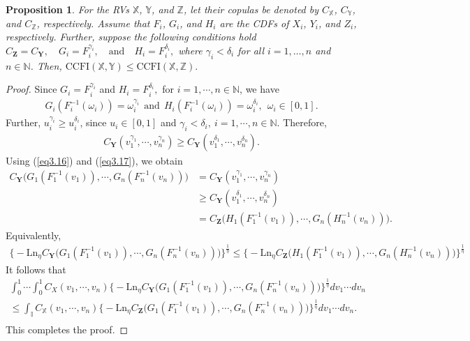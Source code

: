\documentclass[12pt, a4paper]{article}
\numberwithin{equation}{section}
\newtheorem{proposition}{Proposition}[section]
\begin{document}
\begin{proposition}\label{prop3.3}
For the RVs \(\mathbb{X}\), \(\mathbb{Y}\), and \(\mathbb{Z}\), let their copulas be denoted by \(C_{\mathbb{X}}\), \(C_{\mathbb{Y}}\), and \(C_{\mathbb{Z}}\), respectively. Assume that \(F_i\), \(G_i\), and \(H_i\) are the CDFs of \(X_i\), \(Y_i\), and \(Z_i\), respectively. Further, suppose the following conditions hold $
C_{\mathbf{Z}} = C_{\mathbf{Y}}, \quad G_i = F_i^{\gamma_i}, \quad \text{and} \quad H_i = F_i^{\delta_i},$
where \(\gamma_i < \delta_i\) for all \(i = 1, \dots, n\) and \(n \in \mathbb{N}\).  
Then, $
\text{CCFI}(\mathbb{X}, \mathbb{Y}) \le \text{CCFI}(\mathbb{X}, \mathbb{Z}).$
\end{proposition}
\begin{proof}
Since $G_i=F_i^{\gamma_i}$ and $H_i=F_i^{\delta_i},$ for $i=1,\cdots,n\in\mathbb{N}$, we have
\begin{align}\label{eq3.16}
G_i(F_i^{-1}(\omega_i))=\omega_i^{\gamma_i}~~\text{and}~~H_i(F_i^{-1}(\omega_i))=\omega_i^{\delta_i},~~\omega_i\in[0,1].
\end{align}
Further, $u_i^{\gamma_i}\ge u_i^{\delta_i}$, since  $u_i\in[0,1]$ and $\gamma_i<\delta_i,~i=1,\cdots,n\in\mathbb{N}.$ Therefore,
\begin{align}\label{eq3.17}
C_\textbf{Y}(v_1^{\gamma_1},\cdots,v_n^{\gamma_n})\ge C_\textbf{Y}(v_1^{\delta_1},\cdots,v_n^{\delta_n}).
\end{align}
Using (\ref{eq3.16}) and (\ref{eq3.17}), we obtain
\begin{align*}
C_\textbf{Y}\Big(G_1(F_1^{-1}(v_1)),\cdots,G_n(F_n^{-1}(v_n))\Big)&=C_\textbf{Y}(v_1^{\gamma_1},\cdots,v_n^{\gamma_n})\nonumber\\
&\ge C_\textbf{Y}(v_1^{\delta_1},\cdots,v_n^{\delta_n})\nonumber\\
&=C_\textbf{Z}\Big(H_1(F_1^{-1}(v_1)),\cdots,G_n(H_n^{-1}(v_n))\Big).
\end{align*}
Equivalently,
\begin{align*}
\Big\{-\mathrm{Ln}_{\eta} C_\textbf{Y}\Big(G_1(F_1^{-1}(v_1)),\cdots,G_n(F_n^{-1}(v_n))\Big)\Big\}^{\frac{1}{\eta}}\le \Big\{-\mathrm{Ln}_\eta C_\textbf{Z}\Big(H_1(F_1^{-1}(v_1)),\cdots,G_n(H_n^{-1}(v_n))\Big)\Big\}^{\frac{1}{\eta}}
\end{align*}
It follows that
\begin{align*}
\int_{0}^{1}\cdots \int_{0}^{1} C_X(v_1,\cdots,v_n)\Big\{-\mathrm{Ln}_\eta C_\textbf{Y}\Big(G_1(F_1^{-1}(v_1)),\cdots,G_n(F_n^{-1}(v_n))\Big)\Big\}^{\frac{1}{\eta}}dv_1\cdots dv_n\\
\le \int_{\mathbb I}C_{\mathbb X}(v_1,\cdots,v_n)\Big\{-\mathrm{Ln}_\eta C_\textbf{Z}\Big(G_1(F_1^{-1}(v_1)),\cdots,G_n(F_n^{-1}(v_n))\Big)\Big\}^{\frac{1}{\eta}}dv_1\cdots dv_n.\\
\end{align*} 
This completes the proof.
\end{proof}
\end{document}
